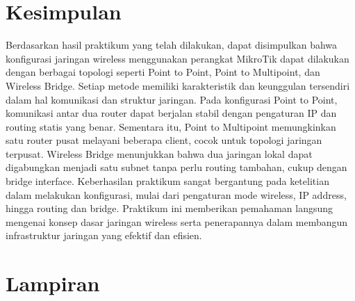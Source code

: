     \section{Kesimpulan}
Berdasarkan hasil praktikum yang telah dilakukan, dapat disimpulkan bahwa konfigurasi jaringan wireless menggunakan perangkat MikroTik dapat dilakukan dengan berbagai topologi seperti Point to Point, Point to Multipoint, dan Wireless Bridge. Setiap metode memiliki karakteristik dan keunggulan tersendiri dalam hal komunikasi dan struktur jaringan. Pada konfigurasi Point to Point, komunikasi antar dua router dapat berjalan stabil dengan pengaturan IP dan routing statis yang benar. Sementara itu, Point to Multipoint memungkinkan satu router pusat melayani beberapa client, cocok untuk topologi jaringan terpusat. Wireless Bridge menunjukkan bahwa dua jaringan lokal dapat digabungkan menjadi satu subnet tanpa perlu routing tambahan, cukup dengan bridge interface. Keberhasilan praktikum sangat bergantung pada ketelitian dalam melakukan konfigurasi, mulai dari pengaturan mode wireless, IP address, hingga routing dan bridge. Praktikum ini memberikan pemahaman langsung mengenai konsep dasar jaringan wireless serta penerapannya dalam membangun infrastruktur jaringan yang efektif dan efisien.


\section{Lampiran}
